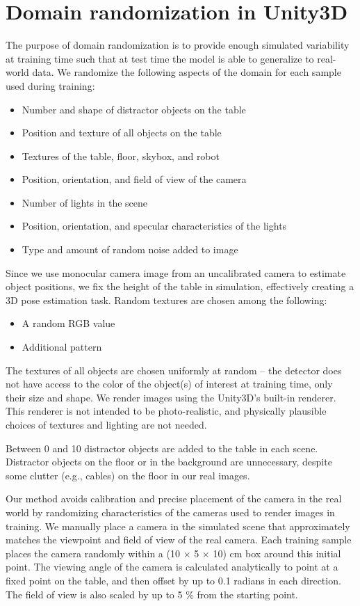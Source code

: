 \section{Domain randomization in Unity3D}
The purpose of domain randomization is to provide enough simulated variability at training time such that at test time the model is able to generalize to real-world data. We randomize the following aspects of the domain for each sample used during training:
\begin{itemize}
	\item Number and shape of distractor objects on the table
	\item Position and texture of all objects on the table
	\item Textures of the table, floor, skybox, and robot
	\item Position, orientation, and field of view of the camera
	\item Number of lights in the scene
	\item Position, orientation, and specular characteristics of the lights
	\item Type and amount of random noise added to image
\end{itemize}
Since we use monocular camera image from an uncalibrated camera to estimate object positions, we fix the height of the table in simulation, effectively creating a 3D pose estimation task. Random textures are chosen among the following:
\begin{itemize}
	\item A random RGB value
	\item Additional pattern
\end{itemize}
The textures of all objects are chosen uniformly at random – the detector does not have access to the color of the object(s) of interest at training time, only their size and shape. We render images using the Unity3D’s \cite{bartneck2015robot} built-in renderer. This renderer is not intended to be photo-realistic, and physically plausible choices of textures and lighting are not needed.

Between 0 and 10 distractor objects are added to the table in each scene. Distractor objects on the floor or in the background are unnecessary, despite some clutter (e.g., cables) on the floor in our real images.

Our method avoids calibration and precise placement of the camera in the real world by randomizing characteristics of the cameras used to render images in training. We manually place a camera in the simulated scene that approximately matches the viewpoint and field of view of the real camera. Each training sample places the camera randomly within a (10 × 5 × 10) cm box around this initial point. The viewing angle of the camera is calculated analytically to point at a fixed point on the table, and then offset by up to 0.1 radians in each direction. The field of view is also scaled by up to 5 \% from the starting point.


